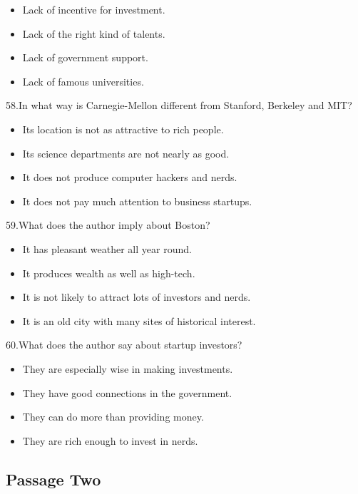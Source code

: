 \documentclass[UTF8,11pt]{ctexart}
\begin{document}
\begin{itemize}[leftmargin=2em,itemsep=.2em,topsep=.4em]\item[A.] Lack of incentive for investment.
\item[B.] Lack of the right kind of talents.
\item[C.] Lack of government support.
\item[D.] Lack of famous universities.
\end{itemize}

58.In what way is Carnegie-Mellon different from Stanford, Berkeley and MIT?


\begin{itemize}[leftmargin=2em,itemsep=.2em,topsep=.4em]\item[A.] Its location is not as attractive to rich people.
\item[B.] Its science departments are not nearly as good.
\item[C.] It does not produce computer hackers and nerds.
\item[D.] It does not pay much attention to business startups.
\end{itemize}

59.What does the author imply about Boston?


\begin{itemize}[leftmargin=2em,itemsep=.2em,topsep=.4em]\item[A.] It has pleasant weather all year round.
\item[B.] It produces wealth as well as high-tech.
\item[C.] It is not likely to attract lots of investors and nerds.
\item[D.] It is an old city with many sites of historical interest.
\end{itemize}

60.What does the author say about startup investors?


\begin{itemize}[leftmargin=2em,itemsep=.2em,topsep=.4em]\item[A.] They are especially wise in making investments.
\item[B.] They have good connections in the government.
\item[C.] They can do more than providing money.
\item[D.] They are rich enough to invest in nerds.
\end{itemize}

\subsection*{\textbf{Passage Two}}
\end{document}
